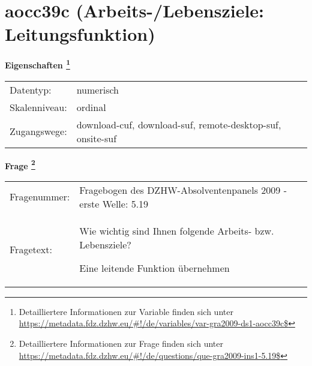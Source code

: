 
    \setcounter{footnote}{0}

    \vspace*{-1.8cm}
	\section{aocc39c (Arbeits-/Lebensziele: Leitungsfunktion)}
	\label{section:aocc39c}



    \vspace*{0.5cm}
    \noindent\textbf{Eigenschaften
	\footnote{Detailliertere Informationen zur Variable finden sich unter
		\url{https://metadata.fdz.dzhw.eu/\#!/de/variables/var-gra2009-ds1-aocc39c$}}}\\
	\begin{tabularx}{\hsize}{@{}lX}
	Datentyp: & numerisch \\
	Skalenniveau: & ordinal \\
	Zugangswege: &
	  download-cuf, 
	  download-suf, 
	  remote-desktop-suf, 
	  onsite-suf
 \\
    \end{tabularx}



				\vspace*{0.5cm}
                \noindent\textbf{Frage
	                \footnote{Detailliertere Informationen zur Frage finden sich unter
		              \url{https://metadata.fdz.dzhw.eu/\#!/de/questions/que-gra2009-ins1-5.19$}}}\\
				\begin{tabularx}{\hsize}{@{}lX}
					Fragenummer: &
					  Fragebogen des DZHW-Absolventenpanels 2009 - erste Welle:
					  5.19
 \\
					Fragetext: & Wie wichtig sind Ihnen folgende Arbeits- bzw. Lebensziele?\par  Eine leitende Funktion übernehmen \\
				\end{tabularx}





